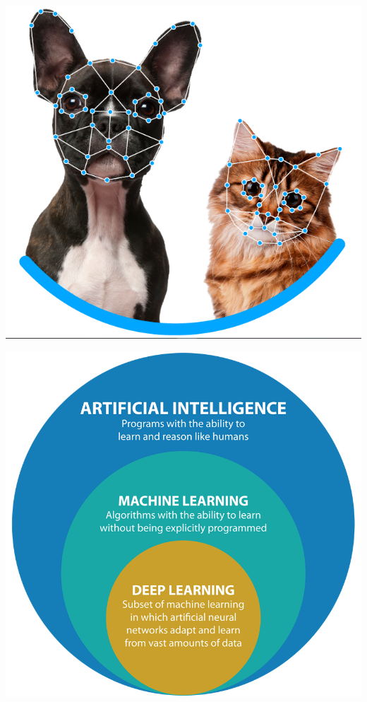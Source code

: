 \documentclass[
]{book}
\begin{document}
\begin{center}\includegraphics{img/01-intro2ds/06_reconocimiento} \end{center}

\begin{center}\includegraphics{img/01-intro2ds/07_ml1} \end{center}
\end{document}
